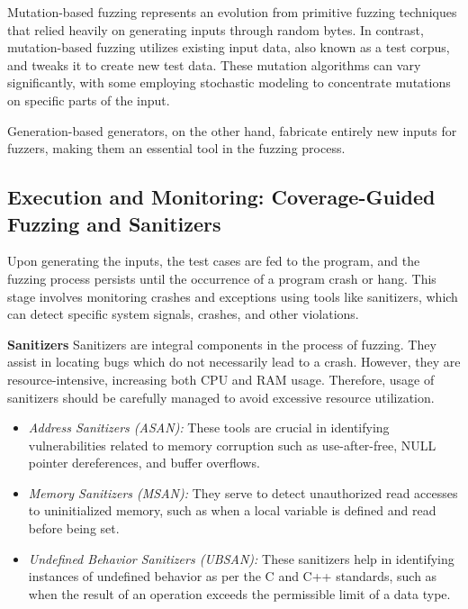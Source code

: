 Mutation-based fuzzing represents an evolution from primitive fuzzing techniques
that relied heavily on generating inputs through random bytes.
In contrast, mutation-based fuzzing utilizes existing input data,
also known as a test corpus, and tweaks it to create new test data\cite{miller2007analysis}.
These mutation algorithms can vary significantly, with some employing
stochastic modeling to concentrate mutations on specific parts of the input\cite{lyu2022ems}\cite{miller2007analysis}.


Generation-based generators, on the other hand, fabricate entirely new inputs
for fuzzers, making them an essential tool in the fuzzing
process\cite{li2018fuzzing}\cite{miller2007analysis}\cite{wang2017skyfire}.

\subsection{Execution and Monitoring: Coverage-Guided Fuzzing and Sanitizers}
Upon generating the inputs, the test cases are fed to the program, and the
fuzzing process persists until the occurrence of a program crash or hang. This
stage involves monitoring crashes and exceptions using tools like
sanitizers\cite{GitHubgo55:online}\cite{osterlund2020parmesan}, which can detect specific system signals,
crashes, and other violations.

\textbf{Sanitizers}
\newline
Sanitizers are integral components in the process of fuzzing. They assist in
locating bugs which do not necessarily lead to a crash. However, they are
resource-intensive, increasing both CPU\cite{WhatisaC78:online} and
RAM\cite{WhatisRA11:online} usage. Therefore, usage of
sanitizers should be carefully managed to avoid excessive resource utilization.

\begin{itemize}

\item \textit{Address Sanitizers (ASAN)\cite{AddressS43:online}:} These tools
are crucial in identifying vulnerabilities related to memory corruption such
as use-after-free, NULL pointer dereferences, and buffer overflows\cite{haller2013dowsing}.

\item \textit{Memory Sanitizers (MSAN)\cite{MemorySa64:online}:} They serve to
detect unauthorized read accesses to uninitialized memory, such as when a local
variable is defined and read before being set\cite{stepanov2015memorysanitizer}.

\item \textit{Undefined Behavior Sanitizers (UBSAN)\cite{Undefine50:online}:} These sanitizers help in
identifying instances of undefined behavior as per the C and C++ standards,
such as when the result of an operation exceeds the permissible limit of a data type.
\end{itemize}


